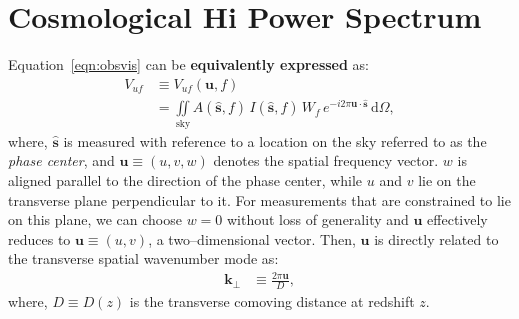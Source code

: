 \documentclass[preprint2,iop,numberedappendix,twocolappendix,appendixfloats]{emulateapj}
\newcommand{\dif}{\mathrm{d}}
\begin{document}
\section{Cosmological H{\sc i} Power Spectrum}\label{sec:EoR-power-spectrum}

Equation~\ref{eqn:obsvis} can be {\bf equivalently expressed} as:
\begin{align}\label{eqn:vis}
  V_{uf} &\equiv V_{uf}(\boldsymbol{u},f) \nonumber\\
  &= \iint\limits_\textrm{sky} A(\hat{\boldsymbol{s}},f)\,I(\hat{\boldsymbol{s}},f)\,W_f\,e^{-i2\pi\boldsymbol{u}\cdot\hat{\boldsymbol{s}}}\,\dif\Omega,
\end{align}
where, $\hat{\boldsymbol{s}}$ is measured with reference to a location on the sky referred to as the {\it phase center}, and $\boldsymbol{u}\equiv (u,v,w)$ denotes the spatial frequency vector. $w$ is aligned parallel to the direction of the phase center, while $u$ and $v$ lie on the transverse plane perpendicular to it. For measurements that are constrained to lie on this plane, we can choose $w=0$ without loss of generality and $\boldsymbol{u}$ effectively reduces to $\boldsymbol{u}\equiv (u,v)$, a two--dimensional vector. Then, $\boldsymbol{u}$ is directly related to the transverse spatial wavenumber mode as: 
\begin{align}\label{eqn:k-perp}
  \boldsymbol{k}_\perp &\equiv \frac{2\pi\boldsymbol{u}}{D}, 
\end{align}
where, $D\equiv D(z)$ is the transverse comoving distance at redshift $z$. 
\end{document}
